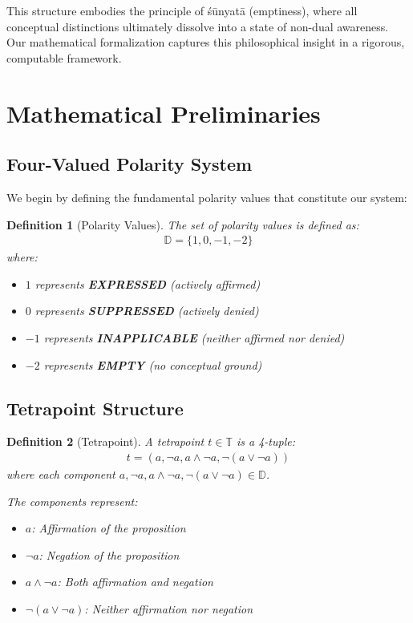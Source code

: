 \documentclass[11pt,a4paper]{article}
\newtheorem{definition}{Definition}
\begin{document}
This structure embodies the principle of śūnyatā (emptiness), where all conceptual distinctions ultimately dissolve into a state of non-dual awareness. Our mathematical formalization captures this philosophical insight in a rigorous, computable framework.

\section{Mathematical Preliminaries}

\subsection{Four-Valued Polarity System}

We begin by defining the fundamental polarity values that constitute our system:

\begin{definition}[Polarity Values]
The set of polarity values is defined as:
\begin{align}
\mathbb{D} = \{1, 0, -1, -2\}
\end{align}
where:
\begin{itemize}
    \item $1$ represents \textbf{EXPRESSED} (actively affirmed)
    \item $0$ represents \textbf{SUPPRESSED} (actively denied)
    \item $-1$ represents \textbf{INAPPLICABLE} (neither affirmed nor denied)
    \item $-2$ represents \textbf{EMPTY} (no conceptual ground)
\end{itemize}
\end{definition}

\subsection{Tetrapoint Structure}

\begin{definition}[Tetrapoint]
A tetrapoint $t \in \mathbb{T}$ is a 4-tuple:
\begin{align}
t = (a, \neg a, a \wedge \neg a, \neg(a \vee \neg a))
\end{align}
where each component $a, \neg a, a \wedge \neg a, \neg(a \vee \neg a) \in \mathbb{D}$.

The components represent:
\begin{itemize}
    \item $a$: Affirmation of the proposition
    \item $\neg a$: Negation of the proposition
    \item $a \wedge \neg a$: Both affirmation and negation
    \item $\neg(a \vee \neg a)$: Neither affirmation nor negation
\end{itemize}
\end{definition}
\end{document}
